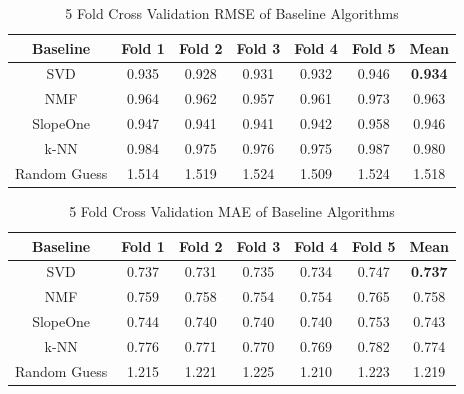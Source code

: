\documentclass{article}
\begin{document}
\begin{table}[H]
    \centering
        \begin{tabular}{|c c c c c c c|} 
         \hline
         Baseline & Fold 1 & Fold 2 & Fold 3 & Fold 4 & Fold 5 & Mean \\ [0.5ex] 
         \hline\hline
         SVD & 0.935 & 0.928 & 0.931 & 0.932 & 0.946 & \bfseries 0.934 \\ 
         \hline
         NMF & 0.964 & 0.962 & 0.957 & 0.961 & 0.973 & 0.963 \\
         \hline
         SlopeOne & 0.947 & 0.941 & 0.941 & 0.942 & 0.958 & 0.946 \\
         \hline
         k-NN & 0.984 & 0.975 & 0.976 & 0.975 & 0.987 & 0.980 \\
         \hline
         Random Guess & 1.514 & 1.519 & 1.524 & 1.509 & 1.524 & 1.518 \\ [1ex] 
         \hline
        \end{tabular}
    \caption{5 Fold Cross Validation RMSE of Baseline Algorithms}
    \label{tab:rmse_results}
\end{table}

\begin{table}[H]
    \centering
        \begin{tabular}{|c c c c c c c|} 
         \hline
         Baseline & Fold 1 & Fold 2 & Fold 3 & Fold 4 & Fold 5 & Mean \\ [0.5ex] 
         \hline\hline
         SVD & 0.737 & 0.731 & 0.735 & 0.734 & 0.747 & \bfseries 0.737 \\ 
         \hline
         NMF & 0.759 & 0.758 & 0.754 & 0.754 & 0.765 & 0.758 \\
         \hline
         SlopeOne & 0.744 & 0.740 & 0.740 & 0.740 & 0.753 & 0.743 \\
         \hline
         k-NN & 0.776 & 0.771 & 0.770 & 0.769 & 0.782 & 0.774 \\
         \hline
         Random Guess & 1.215 & 1.221 & 1.225 & 1.210 & 1.223 & 1.219 \\ [1ex] 
         \hline
        \end{tabular}
    \caption{5 Fold Cross Validation MAE of Baseline Algorithms}
    \label{tab:mae_results}
\end{table}
\end{document}
